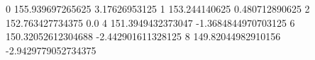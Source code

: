 0 155.939697265625 3.17626953125
1 153.244140625 0.480712890625
2 152.763427734375 0.0
4 151.3949432373047 -1.3684844970703125
6 150.32052612304688 -2.442901611328125
8 149.82044982910156 -2.9429779052734375
